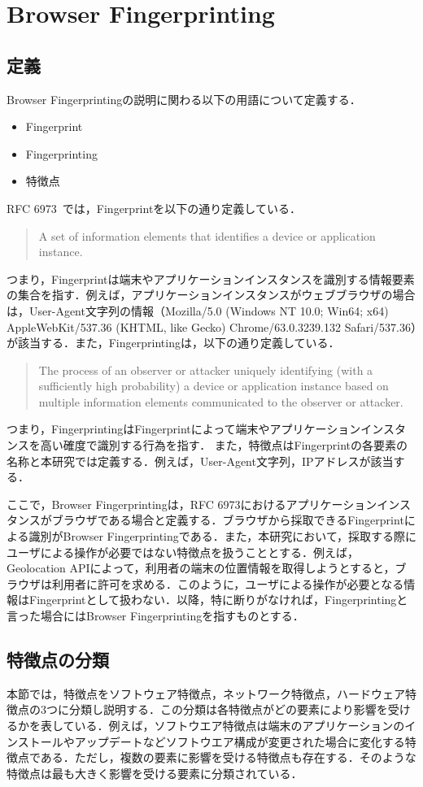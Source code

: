 \newpage
\section{Browser Fingerprinting}
\subsection{定義}
Browser Fingerprintingの説明に関わる以下の用語について定義する．
\begin{itemize}
 \item Fingerprint
 \item Fingerprinting
 \item 特徴点
\end{itemize}
RFC 6973~\cite{rfc6973}では，Fingerprintを以下の通り定義している．
\begin{quote}
A set of information elements that identifies a device or application instance.
\end{quote}
つまり，Fingerprintは端末やアプリケーションインスタンスを識別する情報要素の集合を指す．例えば，アプリケーションインスタンスがウェブブラウザの場合は，User-Agent文字列の情報（Mozilla/5.0 (Windows NT 10.0; Win64; x64) AppleWebKit/537.36 (KHTML, like Gecko) Chrome/63.0.3239.132 Safari/537.36）が該当する．また，Fingerprintingは，以下の通り定義している．
\begin{quote}
The process of an observer or attacker uniquely identifying (with a sufficiently high probability) a device or application instance based on multiple information elements communicated to the observer or attacker.
\end{quote}
つまり，FingerprintingはFingerprintによって端末やアプリケーションインスタンスを高い確度で識別する行為を指す．
また，特徴点はFingerprintの各要素の名称と本研究では定義する．例えば，User-Agent文字列，IPアドレスが該当する．

ここで，Browser Fingerprintingは，RFC 6973におけるアプリケーションインスタンスがブラウザである場合と定義する．ブラウザから採取できるFingerprintによる識別がBrowser Fingerprintingである．また，本研究において，採取する際にユーザによる操作が必要ではない特徴点を扱うこととする．例えば，Geolocation APIによって，利用者の端末の位置情報を取得しようとすると，ブラウザは利用者に許可を求める．このように，ユーザによる操作が必要となる情報はFingerprintとして扱わない．以降，特に断りがなければ，Fingerprintingと言った場合にはBrowser Fingerprintingを指すものとする．

\subsection{特徴点の分類}
本節では，特徴点をソフトウェア特徴点，ネットワーク特徴点，ハードウェア特徴点の3つに分類し説明する．この分類は各特徴点がどの要素により影響を受けるかを表している．例えば，ソフトウエア特徴点は端末のアプリケーションのインストールやアップデートなどソフトウエア構成が変更された場合に変化する特徴点である．ただし，複数の要素に影響を受ける特徴点も存在する．そのような特徴点は最も大きく影響を受ける要素に分類されている．
